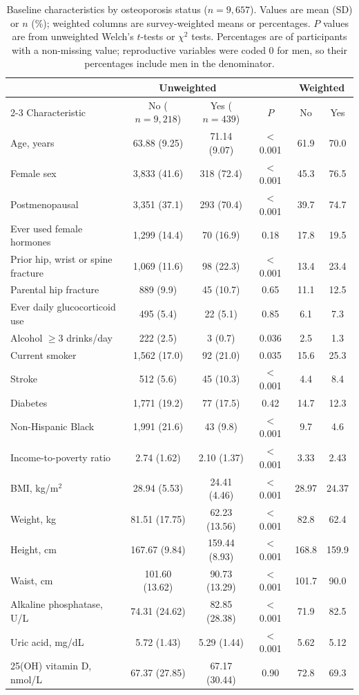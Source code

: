 \documentclass[11pt,a4paper]{article}
\begin{document}
\begin{table}[!htbp]
\centering
\caption{Baseline characteristics by osteoporosis status ($n=9{,}657$). Values are mean (SD) or $n$ (\%); weighted columns are survey-weighted means or percentages. $P$ values are from unweighted Welch's $t$-tests or $\chi^2$ tests. Percentages are of participants with a non-missing value; reproductive variables were coded 0 for men, so their percentages include men in the denominator.}
\label{tab:baseline}
\footnotesize
\setlength{\tabcolsep}{4pt}
\begin{tabular}{lccccc}
\toprule
 & \multicolumn{2}{c}{Unweighted} & & \multicolumn{2}{c}{Weighted} \\
\cmidrule{2-3}\cmidrule{5-6}
Characteristic & No ($n=9{,}218$) & Yes ($n=439$) & $P$ & No & Yes \\
\midrule
Age, years & 63.88 (9.25) & 71.14 (9.07) & $<$0.001 & 61.9 & 70.0 \\
Female sex & 3,833 (41.6) & 318 (72.4) & $<$0.001 & 45.3 & 76.5 \\
Postmenopausal & 3,351 (37.1) & 293 (70.4) & $<$0.001 & 39.7 & 74.7 \\
Ever used female hormones & 1,299 (14.4) & 70 (16.9) & 0.18 & 17.8 & 19.5 \\
Prior hip, wrist or spine fracture & 1,069 (11.6) & 98 (22.3) & $<$0.001 & 13.4 & 23.4 \\
Parental hip fracture & 889 (9.9) & 45 (10.7) & 0.65 & 11.1 & 12.5 \\
Ever daily glucocorticoid use & 495 (5.4) & 22 (5.1) & 0.85 & 6.1 & 7.3 \\
Alcohol $\ge$3 drinks/day & 222 (2.5) & 3 (0.7) & 0.036 & 2.5 & 1.3 \\
Current smoker & 1,562 (17.0) & 92 (21.0) & 0.035 & 15.6 & 25.3 \\
Stroke & 512 (5.6) & 45 (10.3) & $<$0.001 & 4.4 & 8.4 \\
Diabetes & 1,771 (19.2) & 77 (17.5) & 0.42 & 14.7 & 12.3 \\
Non-Hispanic Black & 1,991 (21.6) & 43 (9.8) & $<$0.001 & 9.7 & 4.6 \\
Income-to-poverty ratio & 2.74 (1.62) & 2.10 (1.37) & $<$0.001 & 3.33 & 2.43 \\
BMI, kg/m$^2$ & 28.94 (5.53) & 24.41 (4.46) & $<$0.001 & 28.97 & 24.37 \\
Weight, kg & 81.51 (17.75) & 62.23 (13.56) & $<$0.001 & 82.8 & 62.4 \\
Height, cm & 167.67 (9.84) & 159.44 (8.93) & $<$0.001 & 168.8 & 159.9 \\
Waist, cm & 101.60 (13.62) & 90.73 (13.29) & $<$0.001 & 101.7 & 90.0 \\
Alkaline phosphatase, U/L & 74.31 (24.62) & 82.85 (28.38) & $<$0.001 & 71.9 & 82.5 \\
Uric acid, mg/dL & 5.72 (1.43) & 5.29 (1.44) & $<$0.001 & 5.62 & 5.12 \\
25(OH) vitamin D, nmol/L & 67.37 (27.85) & 67.17 (30.44) & 0.90 & 72.8 & 69.3 \\
\bottomrule
\end{tabular}
\end{table}
\end{document}

